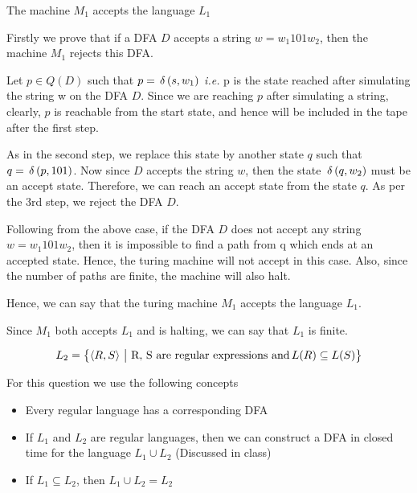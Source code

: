 \documentclass{article}
\begin{document}
\begin{question}
\begin{qpart}{1}
		\begin{qproof}{The machine $M_1$ accepts the language $L_1$}

			Firstly we prove that if a DFA $D$ accepts a string $w = w_1 101 w_2$, then the machine $M_1$ rejects this DFA. \br%

			Let $p \in Q(D)$ such that $p = \func{\delta}{s, w_1}$ \textit{i.e.} p is the state reached after simulating the string w on the DFA $D$. Since we are reaching $p$ after simulating a string, clearly, $p$ is reachable from the start state, and hence will be included in the tape after the first step. \br%

			As in the second step, we replace this state by another state $q$ such that $q = \func{\delta}{p, 101}$. Now since $D$ accepts the string $w$, then the state $\func{\delta}{q, w_2}$ must be an accept state. Therefore, we can reach an accept state from the state $q$. As per the 3rd step, we reject the DFA $D$. \br%

			Following from the above case, if the DFA $D$ does not accept any string $w = w_1 101 w_2$, then it is impossible to find a path from q which ends at an accepted state. Hence, the turing machine will not accept in this case. Also, since the number of paths are finite, the machine will also halt. \br%

			Hence, we can say that the turing machine $M_1$ accepts the language $L_1$.
	
		\end{qproof}

		Since $M_1$ both accepts $L_1$ and is halting, we can say that $L_1$ is finite.

	\end{qpart}

	\begin{qpart}{2}

		\begin{align*}
			L_2 = \left\{ \left\langle R, S \right\rangle \,\big|\, \,\text{R, S are regular expressions and}\, L(R) \subseteq L(S) \right\}
		\end{align*}

		For this question we use the following concepts
		\begin{itemize}
			\item Every regular language has a corresponding DFA
			\item If $L_1$ and $L_2$ are regular languages, then we can construct a DFA in closed time for the language $L_1 \cup L_2$ (Discussed in class)
			\item If $L_1 \subseteq L_2$, then $L_1 \cup L_2 = L_2$
		\end{itemize}


\end{qpart}
\end{question}
\end{document}
